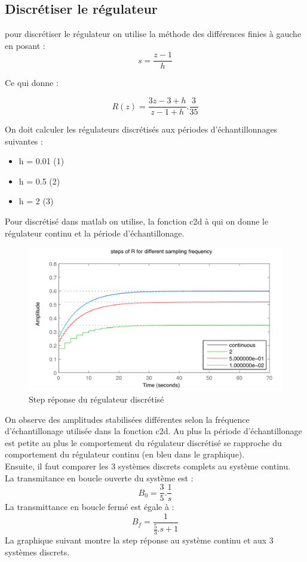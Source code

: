 \subsection{Discrétiser le régulateur}
pour discrétiser le régulateur on utilise la méthode des différences finies à gauche en posant :\\

$$s = \frac{z - 1}{h}$$


Ce qui donne :

$$R(z) = \frac{3z - 3 + h}{z - 1 + h}.\frac{3}{35}$$

On doit calculer les régulateurs discrétisés aux périodes d'échantillonnages suivantes :
\begin{itemize}
    \item h = 0.01 (1)
    \item h = 0.5 (2)
    \item h = 2 (3)
\end{itemize}

Pour discrétisé dans matlab on utilise, la fonction c2d à qui on donne le régulateur continu et la période d'échantillonage.

\begin{figure}[!h]
\center\includegraphics[width=1\linewidth]{images/graph2_1.png}
\caption{Step réponse du régulateur discrétisé}
\label{labo2-1}
\end{figure}

On observe des amplitudes stabilisées différentes selon la fréquence d'échantillonage utilisée dans la fonction c2d. Au plus la période d'échantillonage est petite au plus le comportement du régulateur discrétisé se rapproche du comportement du régulateur continu (en bleu dans le graphique).\\

Ensuite, il faut comparer les 3 systèmes discrets complets au système continu.\\
La transmitance en boucle ouverte du système est :
$$B_{0} = \frac{3}{5}. \frac{1}{s}$$
La transmittance en boucle fermé est égale à :
$$B_{f} = \frac{1}{\frac{5}{3}.s + 1}$$
La graphique suivant montre la step réponse au système continu et aux 3 systèmes discrets.

